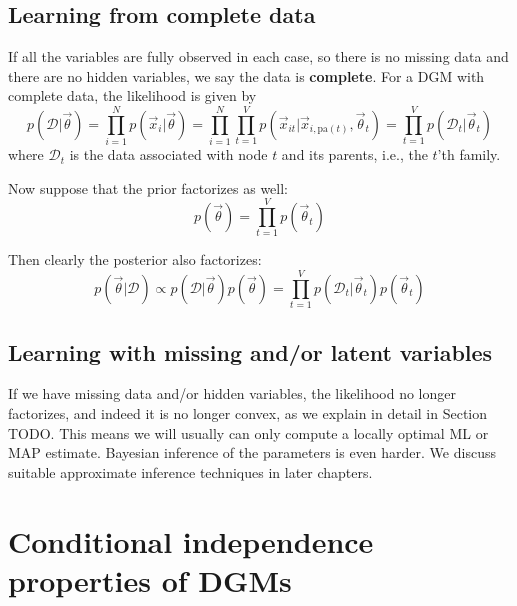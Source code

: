 \subsection{Learning from complete data}
If all the variables are fully observed in each case, so there is no missing data and there are no hidden variables, we say the data is \textbf{complete}. For a DGM with complete data, the likelihood is given by
\begin{equation}
p(\mathcal{D}|\vec{\theta}) = \prod_{i=1}^N p(\vec{x}_i|\vec{\theta})
= \prod_{i=1}^N\prod_{t=1}^V p(\vec{x}_{it}|\vec{x}_{i, \mathrm{pa}(t)}, \vec{\theta}_t)
= \prod_{t=1}^V p(\mathcal{D}_t|\vec{\theta}_t)
\end{equation}
where $\mathcal{D}_t$ is the data associated with node $t$ and its parents, i.e., the $t$'th family.

Now suppose that the prior factorizes as well:
\begin{equation}
p(\vec{\theta})=\prod\limits_{t=1}^V p(\vec{\theta}_t)
\end{equation}

Then clearly the posterior also factorizes:
\begin{equation}
p(\vec{\theta}|\mathcal{D}) \propto p(\mathcal{D}|\vec{\theta})p(\vec{\theta}) = \prod\limits_{t=1}^V p(\mathcal{D}_t|\vec{\theta}_t)p(\vec{\theta}_t)
\end{equation}


\subsection{Learning with missing and/or latent variables}
If we have missing data and/or hidden variables, the likelihood no longer factorizes, and indeed it is no longer convex, as we explain in detail in Section TODO. This means we will usually can only compute a locally optimal ML or MAP estimate. Bayesian inference of the parameters is even harder. We discuss suitable approximate inference techniques in later chapters.


\section{Conditional independence properties of DGMs}


